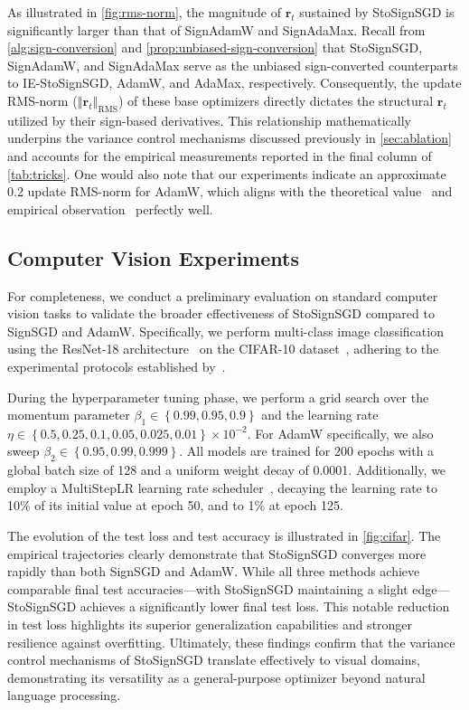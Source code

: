 \documentclass{article}
\def \r {\mathbf{r}}
\newcommand{\norm}[1]{\left\Vert#1\right\Vert}
\newcommand{\cbrac}[1]{\left\{#1\right\}}
\begin{document}
As illustrated in \cref{fig:rms-norm}, the magnitude of $\r_t$ sustained by StoSignSGD is significantly larger than that of SignAdamW and SignAdaMax. Recall from \cref{alg:sign-conversion} and \cref{prop:unbiased-sign-conversion} that StoSignSGD, SignAdamW, and SignAdaMax serve as the unbiased sign-converted counterparts to IE-StoSignSGD, AdamW, and AdaMax, respectively. Consequently, the update RMS-norm ($\norm{\r_t}_\text{RMS}$) of these base optimizers directly dictates the structural $\r_t$ utilized by their sign-based derivatives. This relationship mathematically underpins the variance control mechanisms discussed previously in \cref{sec:ablation} and accounts for the empirical measurements reported in the final column of \cref{tab:tricks}. One would also note that our experiments indicate an approximate 0.2 update RMS-norm for AdamW, which aligns with the theoretical value~\citep{pmlr-v235-kosson24a} and empirical observation~\citep{liu2025muon} perfectly well.

\subsection{Computer Vision Experiments}

For completeness, we conduct a preliminary evaluation on standard computer vision tasks to validate the broader effectiveness of StoSignSGD compared to SignSGD and AdamW. Specifically, we perform multi-class image classification using the ResNet-18 architecture~\citep{he2016resnet} on the CIFAR-10 dataset~\citep{krizhevsky2009learning}, adhering to the experimental protocols established by~\citet{yuan25mars,jiang2025improved}.

During the hyperparameter tuning phase, we perform a grid search over the momentum parameter $\beta_1 \in \cbrac{0.99, 0.95, 0.9}$ and the learning rate $\eta \in \cbrac{0.5, 0.25, 0.1, 0.05, 0.025, 0.01}\times10^{-2}$. For AdamW specifically, we also sweep $\beta_2 \in \cbrac{0.95, 0.99, 0.999}$. All models are trained for 200 epochs with a global batch size of 128 and a uniform weight decay of 0.0001. Additionally, we employ a MultiStepLR learning rate scheduler~\citep{NEURIPS2019PYTORCH}, decaying the learning rate to 10\% of its initial value at epoch 50, and to 1\% at epoch 125.

The evolution of the test loss and test accuracy is illustrated in \cref{fig:cifar}. The empirical trajectories clearly demonstrate that StoSignSGD converges more rapidly than both SignSGD and AdamW. While all three methods achieve comparable final test accuracies---with StoSignSGD maintaining a slight edge---StoSignSGD achieves a significantly lower final test loss. This notable reduction in test loss highlights its superior generalization capabilities and stronger resilience against overfitting. Ultimately, these findings confirm that the variance control mechanisms of StoSignSGD translate effectively to visual domains, demonstrating its versatility as a general-purpose optimizer beyond natural language processing.
\end{document}
